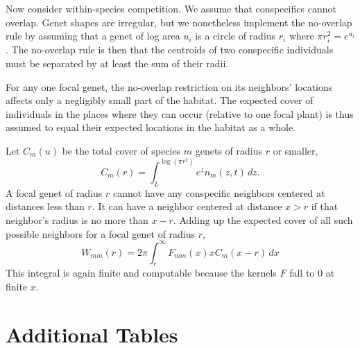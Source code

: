 \documentclass[11pt]{article}
\begin{document}
Now consider within-species competition. We assume that conspecifics cannot overlap. Genet shapes are irregular, but we 
nonetheless implement the no-overlap rule by assuming that a genet of log area $u_i$ is a 
circle of radius $r_i$ where $\pi r_i^2 = e^{u_i}$. The no-overlap rule is then that the centroids of two conspecific individuals 
must be separated by at least the sum of their radii. 

For any one focal genet, the no-overlap restriction on its neighbors' locations affects 
only a negligibly small part of the habitat. The expected cover of individuals in the places
where they can occur (relative to one focal plant) is thus assumed to equal their expected locations
in the habitat as a whole. 
 
Let $C_m(u)$ be the total cover of species $m$ genets of radius $r$ or smaller, 
\begin{equation}
C_m(r) = \int_L^{\log(\pi r^2)}{\! \! \! e^z n_m(z,t) \, dz} .
\label{eqn:cm}
\end{equation}
A focal genet of radius $r$ cannot have any conspecific neighbors centered 
at distances less than $r$. It can have a neighbor centered at distance $x>r$ if that neighbor's
radius is no more than $x-r$. Adding up the expected cover of all such possible neighbors
for a focal genet of radius $r$,    
\begin{equation}
W_{mm}(r) = 2 \pi \int_r^{\infty}F_{mm}(x) x C_m(x-r) \, dx
\label{eqn:wbarmr} 
\end{equation}
This integral is again finite and computable because the kernels $F$ fall to 0 at finite $x$. 

\clearpage 
\newpage  
\section{Additional Tables} 

\end{document}
